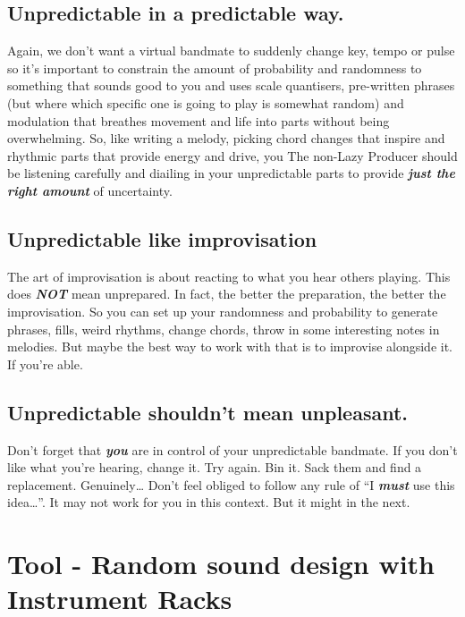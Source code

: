 \documentclass[
  12pt,
  letterpaper,
  oneside,
  open=any]{scrbook}
\begin{document}
\section{Unpredictable in a predictable
way.}\label{unpredictable-in-a-predictable-way.}

Again, we don't want a virtual bandmate to suddenly change key, tempo or
pulse so it's important to constrain the amount of probability and
randomness to something that sounds good to you and uses scale
quantisers, pre-written phrases (but where which specific one is going
to play is somewhat random) and modulation that breathes movement and
life into parts without being overwhelming. So, like writing a melody,
picking chord changes that inspire and rhythmic parts that provide
energy and drive, you The non-Lazy Producer should be listening
carefully and diailing in your unpredictable parts to provide
\textbf{\emph{just the right amount}} of uncertainty.

\section{Unpredictable like
improvisation}\label{unpredictable-like-improvisation}

The art of improvisation is about reacting to what you hear others
playing. This does \textbf{\emph{NOT}} mean unprepared. In fact, the
better the preparation, the better the improvisation. So you can set up
your randomness and probability to generate phrases, fills, weird
rhythms, change chords, throw in some interesting notes in melodies. But
maybe the best way to work with that is to improvise alongside it. If
you're able.

\section{Unpredictable shouldn't mean
unpleasant.}\label{unpredictable-shouldnt-mean-unpleasant.}

Don't forget that \textbf{\emph{you}} are in control of your
unpredictable bandmate. If you don't like what you're hearing, change
it. Try again. Bin it. Sack them and find a replacement.
Genuinely\ldots{} Don't feel obliged to follow any rule of ``I
\textbf{\emph{must}} use this idea\ldots{}''. It may not work for you in
this context. But it might in the next.


\chapter{Tool - Random sound design with Instrument
Racks}\label{Chapter-024-Tool-Random_Sound_Design}
\end{document}
